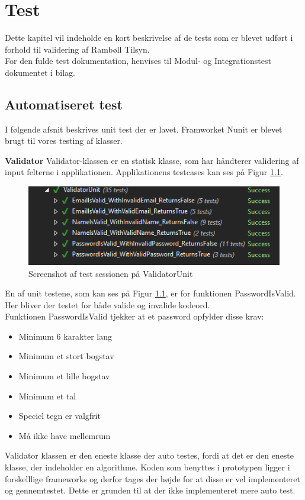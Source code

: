 \chapter{Test}
Dette kapitel vil indeholde en kort beskrivelse af de tests som er blevet udført i forhold til validering af Rambøll Tilsyn. \\
For den fulde test dokumentation, henvises til Modul- og Integrationstest dokumentet i bilag. \\

\section{Automatiseret test}
I følgende afsnit beskrives unit test der er lavet. Framworket Nunit\cite{NUnit} er blevet brugt til vores testing af klasser. 

\textbf{Validator}
Validator-klassen er en statisk klasse, som har håndterer validering af input felterne i applikationen. Applikationens testcases kan ses på Figur \ref{fig:ValidatorUnit}.
\begin{figure}[H]
	\centering
	\includegraphics[width=0.6\linewidth]{Test/ValidatorUnit}
	\caption{Screenshot af test sessionen på ValidatorUnit}
	\label{fig:ValidatorUnit}
\end{figure}

En af unit testene, som kan ses på Figur \ref{fig:ValidatorUnit}, er for funktionen PasswordIsValid. Her bliver der testet for både valide og invalide kodeord.\\
Funktionen PasswordIsValid tjekker at et password opfylder disse krav:
\begin{itemize}
	\item Minimum 6 karakter lang
	\item Minimum et stort bogstav
	\item Minimum et lille bogstav
	\item Minimum et tal
	\item Speciel tegn er valgfrit
	\item Må ikke have mellemrum
\end{itemize}

Validator klassen er den eneste klasse der auto testes, fordi at det er den eneste klasse, der indeholder en algorithme. Koden som benyttes i prototypen ligger i forskelllige frameworks og derfor tages der højde for at disse er vel implementeret og gennemtestet. Dette er grunden til at der ikke implementeret mere auto test. 

